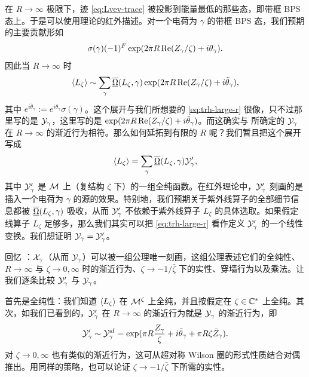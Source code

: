 在 $R\to\infty$ 极限下，迹 \eqref{eq:Lvev-trace}
被投影到能量最低的那些态，即带框 BPS 态上。于是可以使用理论的红外描述。对一个电荷为 $\gamma$ 的带框 BPS 态，我们预期的主要贡献形如
\begin{equation}
\sigma(\gamma) (-1)^{F} \exp(2 \pi R \, {\rm Re} (Z_\gamma / \zeta) + i \theta_\gamma).
\end{equation}
因此当 $R\to\infty$ 时
\begin{equation}\label{eq:Lzeta-asymp}
\langle L_\zeta \rangle \sim \sum_\gamma \overline{\underline{\Omega}}(L_\zeta, \gamma) \exp(2\pi R
\, {\rm Re} (Z_\gamma / \zeta) + i \tilde\theta_\gamma),
\end{equation}
其中 $e^{i \tilde\theta_{\gamma}}:= e^{i \theta_{\gamma}}\sigma(\gamma)$。这个展开与我们所想要的 \eqref{eq:trh-large-r}
很像，只不过那里写的是 $\mathcal{Y}_\gamma$，这里写的是 $\exp(2\pi R \, {\rm Re} (Z_\gamma / \zeta) + i \tilde\theta_\gamma)$。而这确实与 \cite{Gaiotto:2008cd} 所确定的 $\mathcal{Y}_\gamma$ 在 $R\to\infty$ 的渐近行为相符。那么如何延拓到有限的 $R$ 呢？我们暂且把这个展开写成
\begin{equation} \label{eq:trh-large-r-prov}
\langle L_\zeta \rangle = \sum_\gamma \overline{\underline{\Omega}}(L_\zeta, \gamma) \mathcal{Y}'_\gamma,
\end{equation}
其中 $\mathcal{Y}'_\gamma$ 是 $\mathcal{M}$ 上（复结构 $\zeta$ 下）的一组全纯函数。在红外理论中，$\mathcal{Y}'_\gamma$ 刻画的是插入一个电荷为 $\gamma$ 的源的效果。特别地，我们预期关于紫外线算子的全部细节信息都被 $\overline{\underline{\Omega}}(L_\zeta, \gamma)$ 吸收，从而 $\mathcal{Y}'_\gamma$ 不依赖于紫外线算子 $L_\zeta$ 的具体选取。如果假定线算子 $L_\zeta$ 足够多，那么我们其实可以把 \eqref{eq:trh-large-r}
看作定义 $\mathcal{Y}'_\gamma$ 的一个线性变换。我们想证明 $\mathcal{Y}_{\gamma}=\mathcal{Y}'_\gamma$。

回忆 \cite{Gaiotto:2008cd,Gaiotto:2009hg}：$\mathcal{X}_\gamma$（从而 $\mathcal{Y}_\gamma$）可以被一组公理唯一刻画，这组公理表述它们的全纯性、$R\to\infty$ 与 $\zeta\to 0,\infty$ 时的渐近行为、$\zeta\to -1/\bar\zeta$ 下的实性、穿墙行为以及乘法。让我们逐条比较 $\mathcal{Y}'_\gamma$ 与 $\mathcal{Y}_\gamma$。

首先是全纯性：我们知道 $\langle L_\zeta \rangle$ 在 $\mathcal{M}^\zeta$ 上全纯，并且按假定在 $\zeta\in\mathbb{C}^*$ 上全纯。其次，如我们已看到的，$\mathcal{Y}'_\gamma$ 在 $R\to\infty$ 的渐近行为就是 $\mathcal{Y}_\gamma$ 的渐近行为，即
\begin{equation}\label{eq:X-asymps}
\mathcal{Y}'_\gamma \sim \mathcal{Y}_{\gamma}^{\rm sf} = \exp( \pi R
 \frac{Z_\gamma}{\zeta} + i \tilde\theta_\gamma + \pi R \zeta \bar Z_{\gamma} ).
\end{equation}
对 $\zeta\to 0,\infty$ 也有类似的渐近行为，这可从超对称 Wilson 圈的形式性质结合对偶推出。用同样的策略，也可以论证 $\zeta\to -1/\bar\zeta$ 下所需的实性。

